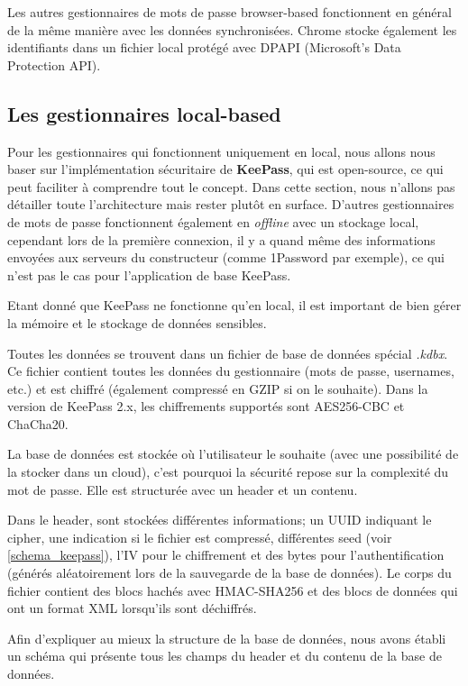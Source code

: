 Les autres gestionnaires de mots de passe browser-based fonctionnent en général de la même manière avec les données synchronisées. Chrome stocke également les identifiants dans un fichier local protégé avec DPAPI (Microsoft's Data Protection API).
\subsection{Les gestionnaires local-based}
\label{local}
Pour les gestionnaires qui fonctionnent uniquement en local, nous allons nous baser sur l'implémentation sécuritaire de \textbf{KeePass}, qui est open-source, ce qui peut faciliter à comprendre tout le concept. Dans cette section, nous n'allons pas détailler toute l'architecture mais rester plutôt en surface. D'autres gestionnaires de mots de passe fonctionnent également en \textit{offline} avec un stockage local, cependant lors de la première connexion, il y a quand même des informations envoyées aux serveurs du constructeur (comme 1Password par exemple), ce qui n'est pas le cas pour l'application de base KeePass.

Etant donné que KeePass ne fonctionne qu'en local, il est important de bien gérer la mémoire et le stockage de données sensibles.

Toutes les données se trouvent dans un fichier de base de données spécial \textit{.kdbx}. Ce fichier contient toutes les données du gestionnaire (mots de passe, usernames, etc.) et est chiffré (également compressé en GZIP si on le souhaite). Dans la version de KeePass 2.x, les chiffrements supportés sont AES256-CBC et ChaCha20. 

La base de données est stockée où l'utilisateur le souhaite (avec une possibilité de la stocker dans un cloud), c'est pourquoi la sécurité repose sur la complexité du mot de passe. Elle est structurée avec un header et un contenu\cite{keepassstruct}\cite{keepassieee}.

Dans le header, sont stockées différentes informations; un UUID indiquant le cipher, une indication si le fichier est compressé, différentes seed (voir \ref{schema_keepass}), l'IV pour le chiffrement et des bytes pour l'authentification (générés aléatoirement lors de la sauvegarde de la base de données). Le corps du fichier contient des blocs hachés avec HMAC-SHA256 et des blocs de données qui ont un format XML lorsqu'ils sont déchiffrés.

Afin d'expliquer au mieux la structure de la base de données, nous avons établi un schéma qui présente tous les champs du header et du contenu de la base de données.

